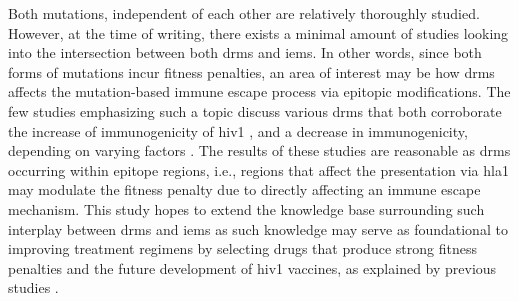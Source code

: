 Both mutations, independent of each other are relatively thoroughly studied. However, at the time of writing, there exists a minimal amount of studies looking into the intersection between both \acp{drm} and \acp{iem}. In other words, since both forms of mutations incur fitness penalties, an area of interest may be how \acp{drm} affects the mutation-based immune escape process via epitopic modifications. The few studies emphasizing such a topic discuss various \acp{drm} that both corroborate the increase of immunogenicity of \ac{hiv1} \cite{masonAntiretroviralDrugResistance2004,blanco-herediaIdentificationImmunogenicCytotoxic2016}, and a decrease in immunogenicity, depending on varying factors \cite{muellerInfluenceMajorHIV12011,rahmanRaltegravirElvitegravirresistanceMutation2014}. The results of these studies are reasonable as \acp{drm} occurring within epitope regions, i.e., regions that affect the presentation via \ac{hla1} may modulate the fitness penalty due to directly affecting an immune escape mechanism. This study hopes to extend the knowledge base surrounding such interplay between \acp{drm} and \acp{iem} as such knowledge may serve as foundational to improving treatment regimens by selecting drugs that produce strong fitness penalties and the future development of \ac{hiv1} vaccines, as explained by previous studies \cite{muellerInfluenceMajorHIV12011,rahmanRaltegravirElvitegravirresistanceMutation2014}.